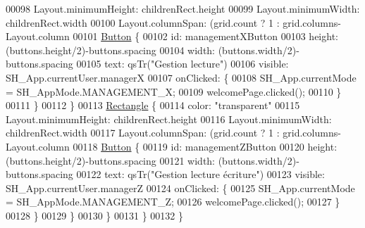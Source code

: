 \begin{DoxyCode}
00098                 Layout.minimumHeight: childrenRect.height
00099                 Layout.minimumWidth: childrenRect.width
00100                 Layout.columnSpan: (grid.count%
      ? 1 : grid.columns-Layout.column
00101                 \hyperlink{classButton}{Button} \{
00102                     \textcolor{keywordtype}{id}: managementXButton
00103                     height: (buttons.height/2)-buttons.spacing
00104                     width: (buttons.width/2)-buttons.spacing
00105                     text: qsTr(\textcolor{stringliteral}{"Gestion lecture"})
00106                     visible: SH\_App.currentUser.managerX
00107                     onClicked: \{
00108                         SH\_App.currentMode = SH\_AppMode.MANAGEMENT\_X;
00109                         welcomePage.clicked();
00110                     \}
00111                 \}
00112             \}
00113             \hyperlink{classRectangle}{Rectangle} \{
00114                 color: \textcolor{stringliteral}{"transparent"}
00115                 Layout.minimumHeight: childrenRect.height
00116                 Layout.minimumWidth: childrenRect.width
00117                 Layout.columnSpan: (grid.count%
      ? 1 : grid.columns-Layout.column
00118                 \hyperlink{classButton}{Button} \{
00119                     \textcolor{keywordtype}{id}: managementZButton
00120                     height: (buttons.height/2)-buttons.spacing
00121                     width: (buttons.width/2)-buttons.spacing
00122                     text: qsTr(\textcolor{stringliteral}{"Gestion lecture écriture"})
00123                     visible: SH\_App.currentUser.managerZ
00124                     onClicked: \{
00125                         SH\_App.currentMode = SH\_AppMode.MANAGEMENT\_Z;
00126                         welcomePage.clicked();
00127                     \}
00128                 \}
00129             \}
00130         \}
00131     \}
00132 \}
\end{DoxyCode}
